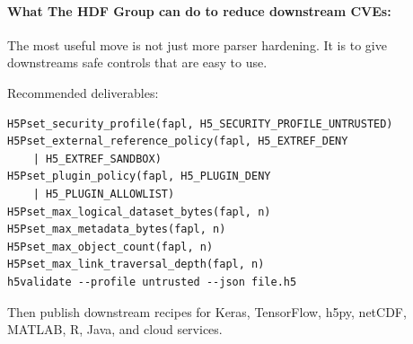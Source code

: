 \documentclass[../main.tex]{subfiles}
\begin{document}
\paragraph{What The HDF Group can do to reduce downstream CVEs:}
The most useful move is not just more parser hardening.
It is to give downstreams safe controls that are easy to use.

Recommended deliverables:
\begin{verbatim}
H5Pset_security_profile(fapl, H5_SECURITY_PROFILE_UNTRUSTED)
H5Pset_external_reference_policy(fapl, H5_EXTREF_DENY
    | H5_EXTREF_SANDBOX)
H5Pset_plugin_policy(fapl, H5_PLUGIN_DENY
    | H5_PLUGIN_ALLOWLIST)
H5Pset_max_logical_dataset_bytes(fapl, n)
H5Pset_max_metadata_bytes(fapl, n)
H5Pset_max_object_count(fapl, n)
H5Pset_max_link_traversal_depth(fapl, n)
h5validate --profile untrusted --json file.h5
\end{verbatim}

Then publish downstream recipes for Keras, TensorFlow, h5py,
netCDF, MATLAB, R, Java, and cloud services.
\end{document}
